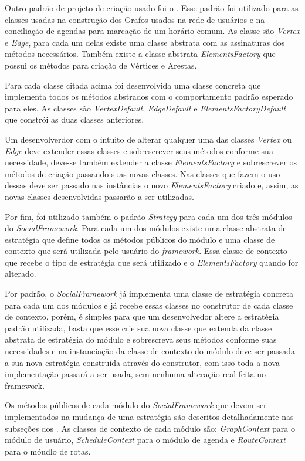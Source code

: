 Outro padrão de projeto de criação usado foi o . Esse padrão foi utilizado para as classes usadas na construção dos Grafos usados na rede de usuários e na conciliação de agendas para marcação de um horário comum. As classe são \textit{Vertex} e \textit{Edge}, para cada um delas existe uma classe abstrata com as assinaturas dos métodos necessários. Também existe a classe abstrata \textit{ElementsFactory} que possui os métodos para criação de Vértices e Arestas.

Para cada classe citada acima foi desenvolvida uma classe concreta que implementa todos os métodos abstrados com o comportamento padrão esperado para eles. As classes são \textit{VertexDefault}, \textit{EdgeDefault} e \textit{ElementsFactoryDefault} que constrói as duas classes anteriores.

Um desenvolverdor com o intuito de alterar qualquer uma das classes \textit{Vertex} ou \textit{Edge} deve extender essas classes e sobrescrever seus métodos conforme sua necessidade, deve-se também extender a classe \textit{ElementsFactory} e sobrescrever os métodos de criação passando suas novas classes. Nas classes que fazem o uso dessas deve ser passado nas instâncias o novo \textit{ElementsFactory} criado e, assim, as novas classes desenvolvidas passarão a ser utilizadas.

Por fim, foi utilizado também o padrão \textit{Strategy} para cada um dos três módulos do \textit{SocialFramework}. Para cada um dos módulos existe uma classe abstrata de estratégia que define todos os métodos públicos do módulo e uma classe de contexto que será utilizada pelo usuário do \textit{framework}. Essa classe de contexto que recebe o tipo de estratégia que será utilizado e o \textit{ElementsFactory} quando for alterado.

Por padrão, o \textit{SocialFramework} já implementa uma classe de estratégia concreta para cada um dos módulos e já recebe essas classes no construtor de cada classe de contexto, porém, é simples para que um desenvolvedor altere a estratégia padrão utilizada, basta que esse crie sua nova classe que extenda da classe abstrata de estratégia do módulo e sobrescreva seus métodos conforme suas necessidades e na instanciação da classe de contexto do módulo deve ser passada a sua nova estratégia construída através do construtor, com isso toda a nova implementação passará a ser usada, sem nenhuma alteração real feita no framework.

Os métodos públicos de cada módulo do \textit{SocialFramework} que devem ser implementados na mudança de uma estratégia são descritos detalhadamente nas subseções dos . As classes de contexto de cada módulo são: \textit{GraphContext} para o módulo de usuário, \textit{ScheduleContext} para o módulo de agenda e \textit{RouteContext} para o móudlo de rotas.

